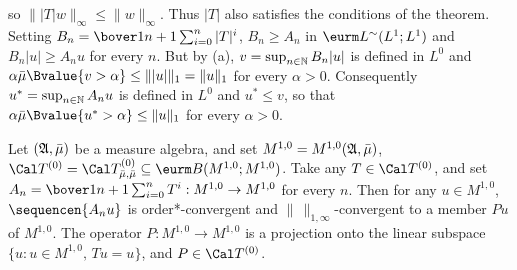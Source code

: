 {

\noindent so $\||T|w\|_{\infty}\le\|w\|_{\infty}$.   Thus $|T|$ also
satisfies the conditions of the theorem.
Setting $B_n=\bover1{n+1}\sum_{i=0}^n|T|^i$, $B_n\ge A_n$ in
$\eurm L^{\sim}(L^1;L^1)$ and $B_n|u|\ge A_nu$ for every $n$.   But by
(a), $v=\sup_{n\in\Bbb N}B_n|u|$ is defined in $L^0$ and
$\alpha\bar\mu\Bvalue{v>\alpha}\le\||u|\|_1=\|u\|_1$ for every
$\alpha>0$.   Consequently $u^*=\sup_{n\in\Bbb N}A_nu$ is defined in
$L^0$ and $u^*\le v$, so that
$\alpha\bar\mu\Bvalue{u^*>\alpha}\le\|u\|_1$ for every $\alpha>0$.
}%


 Let $(\frak A,\bar\mu)$
be a measure algebra, and set $M^{1,0}=M^{1,0}(\frak A,\bar\mu)$,
$\Cal T^{(0)}=\Cal T^{(0)}_{\bar\mu,\bar\mu}
\subseteq\eurm B(M^{1,0};M^{1,0})$.   Take any $T\in\Cal T^{(0)}$, and set
$A_n=\bover1{n+1}\sum_{i=0}^nT^i:M^{1,0}\to M^{1,0}$ for every $n$.
Then for any $u\in M^{1,0}$, $\sequencen{A_nu}$ is
order*-convergent and
$\|\,\|_{1,\infty}$-convergent to a member $Pu$ of $M^{1,0}$.
The operator $P:M^{1,0}\to M^{1,0}$ is a projection onto the linear
subspace $\{u:u\in M^{1,0},\,Tu=u\}$, and $P\in\Cal T^{(0)}$.

